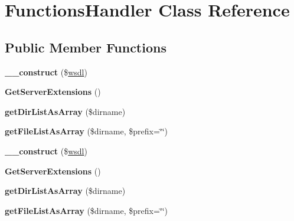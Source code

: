 \hypertarget{class_functions_handler}{\section{Functions\-Handler Class Reference}
\label{class_functions_handler}
}
\subsection*{Public Member Functions}
\begin{DoxyCompactItemize}
\item 
\hypertarget{class_functions_handler_ad7c254ba12ffd0ac70e51f02d01d2d0d}{{\bfseries \-\_\-\-\_\-construct} (\$\hyperlink{classwsdl}{wsdl})}\label{class_functions_handler_ad7c254ba12ffd0ac70e51f02d01d2d0d}

\item 
\hypertarget{class_functions_handler_a3b2741d080118933fb9d53d2ea9fe48c}{{\bfseries Get\-Server\-Extensions} ()}\label{class_functions_handler_a3b2741d080118933fb9d53d2ea9fe48c}

\item 
\hypertarget{class_functions_handler_a7a976c031e5562502b91e587839da05a}{{\bfseries get\-Dir\-List\-As\-Array} (\$dirname)}\label{class_functions_handler_a7a976c031e5562502b91e587839da05a}

\item 
\hypertarget{class_functions_handler_a2587d6022abcec11c4dd150b341da93f}{{\bfseries get\-File\-List\-As\-Array} (\$dirname, \$prefix=\char`\"{}\char`\"{})}\label{class_functions_handler_a2587d6022abcec11c4dd150b341da93f}

\item 
\hypertarget{class_functions_handler_ad7c254ba12ffd0ac70e51f02d01d2d0d}{{\bfseries \-\_\-\-\_\-construct} (\$\hyperlink{classwsdl}{wsdl})}\label{class_functions_handler_ad7c254ba12ffd0ac70e51f02d01d2d0d}

\item 
\hypertarget{class_functions_handler_a3b2741d080118933fb9d53d2ea9fe48c}{{\bfseries Get\-Server\-Extensions} ()}\label{class_functions_handler_a3b2741d080118933fb9d53d2ea9fe48c}

\item 
\hypertarget{class_functions_handler_a7a976c031e5562502b91e587839da05a}{{\bfseries get\-Dir\-List\-As\-Array} (\$dirname)}\label{class_functions_handler_a7a976c031e5562502b91e587839da05a}

\item 
\hypertarget{class_functions_handler_a2587d6022abcec11c4dd150b341da93f}{{\bfseries get\-File\-List\-As\-Array} (\$dirname, \$prefix=\char`\"{}\char`\"{})}\label{class_functions_handler_a2587d6022abcec11c4dd150b341da93f}


\end{DoxyCompactItemize}
